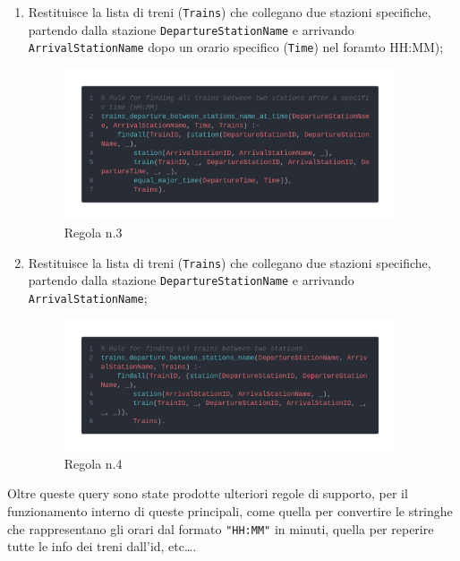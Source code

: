 \documentclass[italian,12pt,a4paper]{article}
\begin{document}
\begin{enumerate}
\begin{figure}[h]
						\end{figure}
						\newpage
					\item Restituisce la lista di treni (\texttt{Trains}) che collegano due stazioni specifiche, partendo dalla stazione \texttt{DepartureStationName} e arrivando \texttt{ArrivalStationName} dopo un orario specifico (\texttt{Time}) nel foramto HH:MM);
						\begin{figure}[h]
							\centering
							\includegraphics[width=370px]{img/code4}
							\caption{Regola n.3}
			
						\end{figure}
					\item Restituisce la lista di treni (\texttt{Trains}) che collegano due stazioni specifiche, partendo dalla stazione \texttt{DepartureStationName} e arrivando \texttt{ArrivalStationName};
						\begin{figure}[h]
							\centering
							\includegraphics[width=370px]{img/code3}
							\caption{Regola n.4}
			
						\end{figure}
							
				\end{enumerate}
						
			Oltre queste query sono state prodotte ulteriori regole di supporto, per il funzionamento interno di queste principali, come quella per convertire le stringhe che rappresentano gli orari dal formato \texttt{"HH:MM"} in minuti, quella per reperire tutte le info dei treni dall'id, etc\dots.
\end{document}
